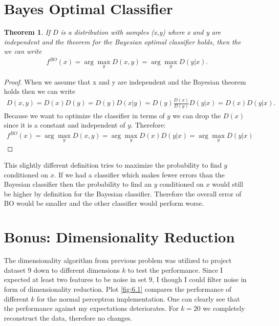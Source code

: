 \documentclass[12pt]{article}
\newtheorem{theorem}{Theorem}[section]
\begin{document}
\newpage



\section{Bayes Optimal Classifier}

\begin{theorem}
	If $D$ is a distribution with samples (x,y) where x and y are independent and the theorem for the Bayesian optimal classifier holds, then the we can write
	\begin{align}
		f^{BO}(x)=\arg\max_yD(x,y) = \arg\max_yD(y|x).
	\end{align}
\end{theorem}
\begin{proof}
	When we assume that x and y are independent and the Bayesian theorem holds then we can write
	\begin{align}
		D(x,y) = D(x)D(y) = D(y)D(x|y) = D(y) \frac{D(x)}{D(y)}D(y|x) = D(x)D(y|x).
	\end{align}
	Because we want to optimize the classifier in terms of $y$ we can drop the $D(x)$ since it is a constant and independent of $y$. Therefore:
	\begin{align}
		f^{BO}(x)=\arg\max_yD(x,y) = \arg\max_yD(x)D(y|x) = \arg\max_yD(y|x)
	\end{align}
\end{proof}

This slightly different definition tries to maximize the probability to find $y$ conditioned on $x$. If we had a classifier which makes fewer errors than the Bayesian classifier then the probability to find an $y$ conditioned on $x$ would still be higher by definition for the Bayesian classifier. Therefore the overall error of BO would be smaller and the other classifier would perform worse.
\newpage

\section{Bonus: Dimensionality Reduction}

The dimensionality algorithm from previous problem was utilized to project dataset 9 down to different dimensions $k$ to test the performance. Since I expected at least two features to be noise in set 9, I though I could filter noise in form of dimensionality reduction. Plot \ref{fig:6.1} compares the performance of different $k$ for the normal perceptron implementation. One can clearly see that the performance against my expectations deteriorates. For $k=20$ we completely reconstruct the data, therefore no changes.
\end{document}
